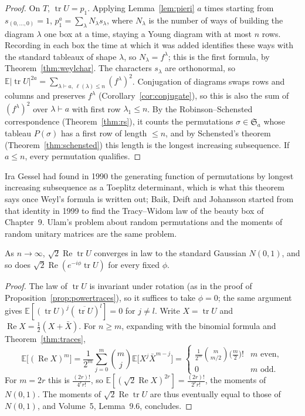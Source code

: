 \begin{proof}
On $T$, $\operatorname{tr}U=p_1$. Applying Lemma~\ref{lem:pieri} $a$ times starting from $s_{(0,\dots,0)}=1$, $p_1^a=\sum_\lambda N_\lambda s_\lambda$, where $N_\lambda$ is the number of ways of building the diagram $\lambda$ one box at a time, staying a Young diagram with
at most $n$ rows. Recording in each box the time at which it was added identifies these ways with the standard tableaux of shape $\lambda$, so $N_\lambda=f^\lambda$; this is the first formula, by Theorem~\ref{thm:weylchar}. The characters $s_\lambda$ are orthonormal,
so $\mathbb E|\operatorname{tr}U|^{2a}=\sum_{\lambda\vdash a,\,\ell(\lambda)\le n}(f^\lambda)^2$. Conjugation of diagrams swaps rows and columns and preserves $f^\lambda$ (Corollary~\ref{cor:conjugate}), so this is also the sum of $(f^\lambda)^2$ over $\lambda\vdash a$ with first
row $\lambda_1\le n$. By the Robinson--Schensted correspondence (Theorem~\ref{thm:rs}), it counts the permutations $\sigma\in\mathfrak S_a$ whose tableau $P(\sigma)$ has a first row of length $\le n$, and by Schensted's theorem (Theorem~\ref{thm:schensted}) this length is the longest
increasing subsequence. If $a\le n$, every permutation qualifies.
\end{proof}

Ira Gessel had found in 1990 the generating function of permutations by longest increasing subsequence as a Toeplitz determinant, which is what this theorem says once Weyl's formula is written out; Baik, Deift and Johansson started from that identity in 1999
to find the Tracy--Widom law of the beauty box of Chapter~9. Ulam's problem about random permutations and the moments of random unitary matrices are the same problem.

\begin{corollary}\label{cor:gaussiantrace}
As $n\to\infty$, $\sqrt2\operatorname{Re}\operatorname{tr}U$ converges in law to the standard Gaussian $N(0,1)$, and so does $\sqrt2\operatorname{Re}(e^{-i\phi}\operatorname{tr}U)$ for every fixed $\phi$.
\end{corollary}

\begin{proof}
The law of $\operatorname{tr}U$ is invariant under rotation (as in the proof of Proposition~\ref{prop:powertraces}), so it suffices to take $\phi=0$; the same argument gives $\mathbb E[(\operatorname{tr}U)^j(\overline{\operatorname{tr}U})^l]=0$ for $j\ne l$. Write $X=\operatorname{tr}U$ and
$\operatorname{Re}X=\frac12(X+\bar X)$. For $n\ge m$, expanding with the binomial formula and Theorem~\ref{thm:traces},
\[
\mathbb E\bigl[(\operatorname{Re}X)^m\bigr]=\frac1{2^m}\sum_{j=0}^m\binom mj\mathbb E\bigl[X^j\bar X^{m-j}\bigr]=\begin{cases}\frac1{2^m}\binom m{m/2}\bigl(\frac m2\bigr)!&m\text{ even},\\0&m\text{ odd}.\end{cases}
\]
For $m=2r$ this is $\frac{(2r)!}{4^rr!}$, so $\mathbb E[(\sqrt2\operatorname{Re}X)^{2r}]=\frac{(2r)!}{2^rr!}$, the moments of $N(0,1)$. The moments of $\sqrt2\operatorname{Re}\operatorname{tr}U$ are thus eventually equal to those of $N(0,1)$, and Volume~5, Lemma~9.6, concludes.
\end{proof}

